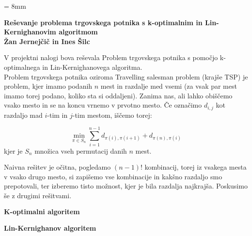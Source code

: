 \documentclass[a4paper,12pt]{article}
\begin{document}
\parindent = 8mm
\begin{center}
\textbf{Reševanje problema trgovskega potnika s k-optimalnim in Lin-Kernighanovim algoritmom}\\
\vspace{5 mm}
\textbf{Žan Jernejčič in Ines Šilc}
\end{center}

V projektni nalogi bova reševala Problem trgovskega potnika s pomočjo k-optimalnega in Lin-Kernighanovega algoritma.\\

Problem trgovskega potnika oziroma Travelling salesman problem (krajše TSP) je problem, kjer imamo podanih $n$ mest in razdalje med vsemi (za vsak par mest imamo torej podano, koliko sta si oddaljeni). Zanima nas, ali lahko obiščemo vsako mesto in se na koncu vrnemo v prvotno mesto. Če označimo $d_{i, j}$ kot razdaljo mad $i$-tim in $j$-tim mestom, iščemo torej:

$$
\min_{\pi \in S_n} \sum\limits_{i=1}^{n-1} d_{\pi (i), \pi (i+1)} + d_{\pi (n), \pi (i)}
$$
 kjer je $S_n$ množica vseh permutacij danih $n$ mest.
 
Naivna rešitev je očitna, pogledamo $(n-1)!$ kombinacij, torej iz vsakega mesta v vsako drugo mesto, si zapišemo vse kombinacije in kakšno razdaljo smo prepotovali, ter izberemo tisto možnost, kjer je bila razdalja najkrajša. Poskusimo še z drugimi rešitvami.

\vspace{5 mm}
\textbf{K-optimalni algoritem}




\vspace{5 mm}
\textbf{Lin-Kernighanov algoritem}
\end{document}
